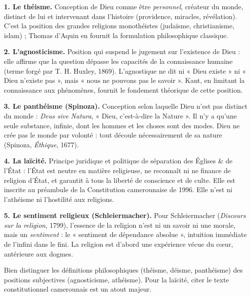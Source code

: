 \documentclass[11pt]{article}
\begin{document}
\begin{corrige}

\textbf{1. Le théisme.} Conception de Dieu comme être \emph{personnel}, créateur du monde, distinct de lui et intervenant dans l'histoire (providence, miracles, révélation). C'est la position des grandes religions monothéistes (judaïsme, christianisme, islam) ; Thomas d'Aquin en fournit la formulation philosophique classique.

\textbf{2. L'agnosticisme.} Position qui suspend le jugement sur l'existence de Dieu : elle affirme que la question dépasse les capacités de la connaissance humaine (terme forgé par T. H. Huxley, 1869). L'agnostique ne dit ni « Dieu existe » ni « Dieu n'existe pas », mais « nous ne pouvons pas le savoir ». Kant, en limitant la connaissance aux phénomènes, fournit le fondement théorique de cette position.

\textbf{3. Le panthéisme (Spinoza).} Conception selon laquelle Dieu n'est pas distinct du monde : \emph{Deus sive Natura}, « Dieu, c'est-à-dire la Nature ». Il n'y a qu'une seule substance, infinie, dont les hommes et les choses sont des modes. Dieu ne crée pas le monde par volonté : tout découle nécessairement de sa nature (Spinoza, \emph{Éthique}, 1677).

\textbf{4. La laïcité.} Principe juridique et politique de séparation des Églises \& de l'État : l'État est neutre en matière religieuse, ne reconnaît ni ne finance de religion d'État, et garantit à tous la liberté de conscience et de culte. Elle est inscrite au préambule de la Constitution camerounaise de 1996. Elle n'est ni l'athéisme ni l'hostilité aux religions.

\textbf{5. Le sentiment religieux (Schleiermacher).} Pour Schleiermacher (\emph{Discours sur la religion}, 1799), l'essence de la religion n'est ni un savoir ni une morale, mais un \emph{sentiment} : le « sentiment de dépendance absolue », intuition immédiate de l'infini dans le fini. La religion est d'abord une expérience vécue du cœur, antérieure aux dogmes.
\end{corrige}
\begin{attention}
Bien distinguer les définitions philosophiques (théisme, déisme, panthéisme) des positions subjectives (agnosticisme, athéisme). Pour la laïcité, citer le texte constitutionnel camerounais est un atout majeur.
\end{attention}
\end{document}

